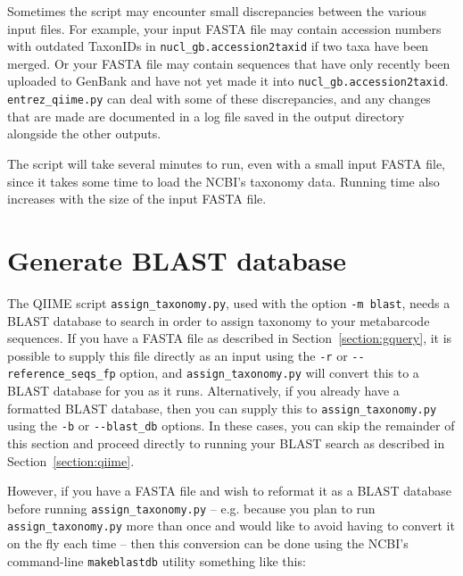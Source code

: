 \documentclass[11pt]{amsart}
\begin{document}
Sometimes the script may encounter small discrepancies between the various input files. For example, your input FASTA file may contain accession numbers with outdated TaxonIDs in \verb|nucl_gb.accession2taxid| if two taxa have been merged. Or your FASTA file may contain sequences that have only recently been uploaded to GenBank and have not yet made it into \verb|nucl_gb.accession2taxid|. \verb|entrez_qiime.py| can deal with some of these discrepancies, and any changes that are made are documented in a log file saved in the output directory alongside the other outputs.


The script will take several minutes to run, even with a small input FASTA file, since it takes some time to load the NCBI's taxonomy data. Running time also increases with the size of the input FASTA file.

\section{Generate BLAST database}
\label{section:blast}

The QIIME script \verb|assign_taxonomy.py|, used with the option \verb|-m blast|, needs a BLAST database to search in order to assign taxonomy to your metabarcode sequences. If you have a FASTA file as described in Section~\ref{section:gquery}, it is possible to supply this file directly as an input using the \verb|-r| or \verb|--reference_seqs_fp| option, and \verb|assign_taxonomy.py| will convert this to a BLAST database for you as it runs. Alternatively, if you already have a formatted BLAST database, then you can supply this to \verb|assign_taxonomy.py| using the \verb|-b| or \verb|--blast_db| options. In these cases, you can skip the remainder of this section and proceed directly to running your BLAST search as described in Section~\ref{section:qiime}.

However, if you have a FASTA file and wish to reformat it as a BLAST database before running \verb|assign_taxonomy.py| -- e.g. because you plan to run \verb|assign_taxonomy.py| more than once and would like to avoid having to convert it on the fly each time -- then this conversion can be done using the NCBI's command-line \verb|makeblastdb| utility something like this:
\end{document}
